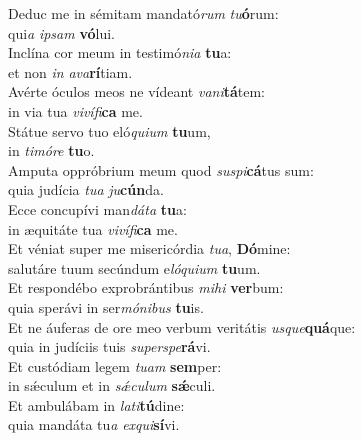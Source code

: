 \oddverse Deduc me in sémitam mandató\textit{rum} \textit{tu}\textbf{ó}rum:~\*\\
\oddverse qui\textit{a} \textit{i}\textit{psam} \textbf{vó}lui.\\
\evenverse Inclína cor meum in testimó\textit{ni}\textit{a} \textbf{tu}a:~\*\\
\evenverse et non \textit{in} \textit{a}\textit{va}\textbf{rí}tiam.\\
\oddverse Avérte óculos meos ne vídeant \textit{va}\textit{ni}\textbf{tá}tem:~\*\\
\oddverse in via tua \textit{vi}\textit{ví}\textit{fi}\textbf{ca} me.\\
\evenverse Státue servo tuo eló\textit{qui}\textit{um} \textbf{tu}um,~\*\\
\evenverse in \textit{ti}\textit{mó}\textit{re} \textbf{tu}o.\\
\oddverse Amputa oppróbrium meum quod \textit{su}\textit{spi}\textbf{cá}tus sum:~\*\\
\oddverse quia judícia \textit{tu}\textit{a} \textit{ju}\textbf{cún}da.\\
\evenverse Ecce concupívi man\textit{dá}\textit{ta} \textbf{tu}a:~\*\\
\evenverse in æquitáte tua \textit{vi}\textit{ví}\textit{fi}\textbf{ca} me.\\
\oddverse Et véniat super me misericórdia \textit{tu}\textit{a}, \textbf{Dó}mine:~\*\\
\oddverse salutáre tuum secúndum e\textit{ló}\textit{qui}\textit{um} \textbf{tu}um.\\
\evenverse Et respondébo exprobrántibus \textit{mi}\textit{hi} \textbf{ver}bum:~\*\\
\evenverse quia sperávi in ser\textit{mó}\textit{ni}\textit{bus} \textbf{tu}is.\\
\oddverse Et ne áuferas de ore meo verbum veritátis \textit{us}\textit{que}\textbf{quá}que:~\*\\
\oddverse quia in judíciis tuis \textit{su}\textit{per}\textit{spe}\textbf{rá}vi.\\
\evenverse Et custódiam legem \textit{tu}\textit{am} \textbf{sem}per:~\*\\
\evenverse in sǽculum et in \textit{sǽ}\textit{cu}\textit{lum} \textbf{sǽ}culi.\\
\oddverse Et ambulábam in \textit{la}\textit{ti}\textbf{tú}dine:~\*\\
\oddverse quia mandáta tu\textit{a} \textit{ex}\textit{qui}\textbf{sí}vi.\\
